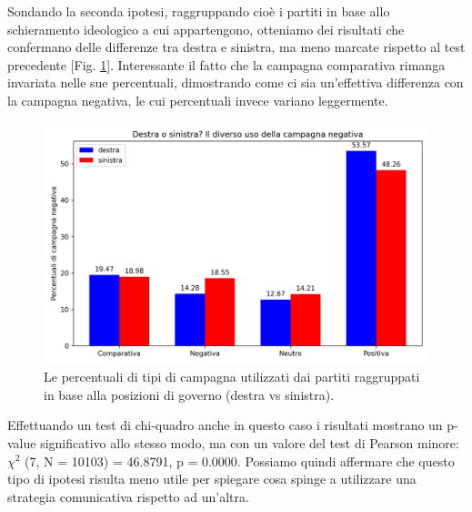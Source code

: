Sondando la seconda ipotesi, raggruppando cioè i partiti in base allo schieramento ideologico a cui appartengono, otteniamo dei risultati che confermano delle differenze tra destra e sinistra, ma meno marcate rispetto al test precedente [Fig. \ref{fig:destra}]. Interessante il fatto che la campagna comparativa rimanga invariata nelle sue percentuali, dimostrando come ci sia un'effettiva differenza con la campagna negativa, le cui percentuali invece variano leggermente.
\begin{figure}
	\includegraphics[width=\textwidth]{figures/destra}
	\caption{Le percentuali di tipi di campagna utilizzati dai partiti raggruppati in base alla posizioni di governo (destra vs sinistra).}
	\label{fig:destra}
\end{figure}


Effettuando un test di chi-quadro anche in questo caso  i risultati mostrano un p-value significativo allo stesso modo, ma con un valore del test di Pearson minore: $\chi^{2}$ (7, N = 10103) = 46.8791, p = 0.0000. Possiamo quindi affermare che questo tipo di ipotesi risulta meno utile per spiegare cosa spinge a utilizzare una strategia comunicativa rispetto ad un’altra.

